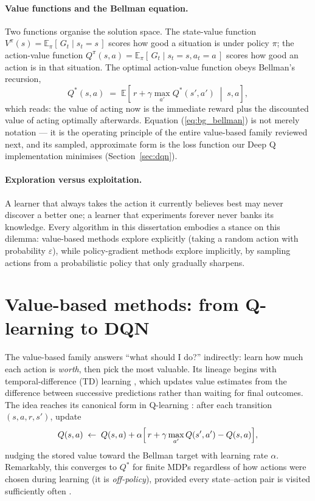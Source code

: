 \paragraph{Value functions and the Bellman equation.} Two functions
organise the solution space. The state-value function
$V^\pi(s) = \mathbb{E}_\pi[\, G_t \mid s_t = s\,]$ scores how good a
situation is under policy $\pi$; the action-value function
$Q^\pi(s,a) = \mathbb{E}_\pi[\, G_t \mid s_t = s, a_t = a\,]$ scores how
good an action is in that situation. The optimal action-value function
obeys Bellman's recursion,
\begin{equation}
Q^\ast(s,a) \;=\; \mathbb{E}\!\left[\, r + \gamma \max_{a'} Q^\ast(s', a')
\;\middle|\; s, a \right],
\label{eq:bg_bellman}
\end{equation}
which reads: the value of acting now is the immediate reward plus the
discounted value of acting optimally afterwards. Equation
(\ref{eq:bg_bellman}) is not merely notation --- it is the operating
principle of the entire value-based family reviewed next, and its
sampled, approximate form is the loss function our Deep Q implementation
minimises (Section~\ref{sec:dqn}).

\paragraph{Exploration versus exploitation.} A learner that always takes
the action it currently believes best may never discover a better one; a
learner that experiments forever never banks its knowledge. Every
algorithm in this dissertation embodies a stance on this dilemma:
value-based methods explore explicitly (taking a random action with
probability $\varepsilon$), while policy-gradient methods explore
implicitly, by sampling actions from a probabilistic policy that only
gradually sharpens.

\section{Value-based methods: from Q-learning to DQN}
\label{sec:bg_value}

The value-based family answers ``what should I do?'' indirectly: learn
how much each action is \emph{worth}, then pick the most valuable. Its
lineage begins with temporal-difference (TD) learning \cite{sutton1988},
which updates value estimates from the difference between successive
predictions rather than waiting for final outcomes. The idea reaches its
canonical form in Q-learning \cite{watkins1992}: after each transition
$(s, a, r, s')$, update
\begin{equation}
Q(s,a) \;\leftarrow\; Q(s,a) + \alpha \Bigl[\,
r + \gamma \max_{a'} Q(s', a') - Q(s,a) \Bigr],
\label{eq:bg_qlearning}
\end{equation}
nudging the stored value toward the Bellman target with learning rate
$\alpha$. Remarkably, this converges to $Q^\ast$ for finite MDPs
regardless of how actions were chosen during learning (it is
\emph{off-policy}), provided every state--action pair is visited
sufficiently often \cite{watkins1992}.

